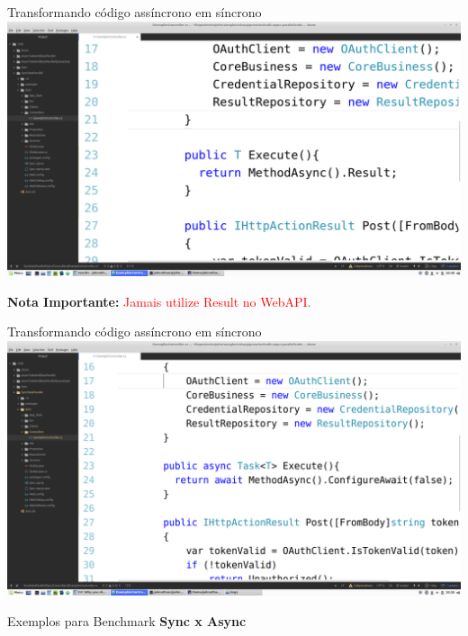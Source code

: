 \documentclass[10pt]{beamer}
\begin{document}
\begin{frame}{Transformando código assíncrono em síncrono}
	\includegraphics[scale=0.085]{imgs/03-asyncToSync2.png}
	\vspace{0.5cm}
	
	\textbf{Nota Importante:} \textcolor{red}{Jamais utilize Result no WebAPI.}
\end{frame}

\begin{frame}{Transformando código assíncrono em síncrono}
	\includegraphics[scale=0.085]{imgs/03-asyncToSync3.png}
\end{frame}

\begin{frame}{Exemplos para Benchmark}
	\textbf{Sync x Async}
\end{frame}
\end{document}
